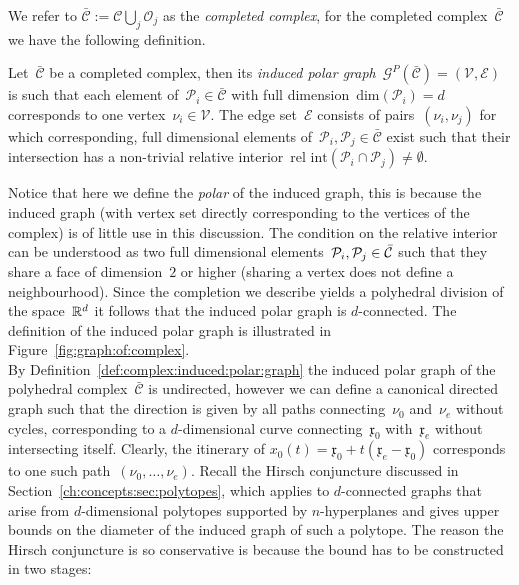 %
We refer to $\bar{\mathcal C}:=\mathcal C\bigcup_j\mathcal O_j$ as the \emph{completed complex}, for the completed complex~$\bar{\mathcal C}$ we have the following definition.
%
\begin{defi}\label{def:complex:induced:polar:graph}
Let~$\bar{\mathcal C}$ be a completed complex, then its \emph{induced polar graph}~$\mathcal G^P(\bar{\mathcal C})=(\mathcal V,\mathcal E)$ is such that each element of~$\mathcal P_i\in\bar{\mathcal C}$ with full dimension~$\text{dim}(\mathcal P_i)=d$ corresponds to one vertex~$\nu_i\in\mathcal V$.
%
The edge set~$\mathcal E$ consists of pairs~$(\nu_i,\nu_j)$ for which corresponding, full dimensional elements of~$\mathcal P_i,\mathcal P_j\in\bar{\mathcal C}$ exist such that their intersection has a non-trivial relative interior~$\text{rel int}(\mathcal P_i\cap\mathcal P_j)\neq\emptyset$.
\end{defi}
%
\noindent Notice that here we define the \emph{polar} of the induced graph, this is because the induced graph (with vertex set directly corresponding to the vertices of the complex) is of little use in this discussion.
%
The condition on the relative interior can be understood as two full dimensional elements~$\mathcal P_i,\mathcal P_j\in\bar{\mathcal C}$ such that they share a face of dimension~$2$ or higher (sharing a vertex does not define a neighbourhood).
%
Since the completion we describe yields a polyhedral division of the space~$\mathbb R^d$ it follows that the induced polar graph is $d$-connected.
%
The definition of the induced polar graph is illustrated in Figure~\ref{fig:graph:of:complex}.
%
\\[1em]
%
\mysplit By Definition~\ref{def:complex:induced:polar:graph} the induced polar graph of the polyhedral complex~$\bar{\mathcal C}$ is undirected, however we can define a canonical directed graph such that the direction is given by all paths connecting~$\nu_0$ and~$\nu_e$ without cycles, corresponding to a $d$-dimensional curve connecting~$\mathfrak{x}_0$ with~$\mathfrak{x}_e$ without intersecting itself.
%
Clearly, the itinerary of $x_0(t) = \mathfrak{x}_0+t(\mathfrak{x}_e-\mathfrak{x}_0)$ corresponds to one such path~$(\nu_0,\dots,\nu_e)$.
%
Recall the Hirsch conjuncture discussed in Section~\ref{ch:concepts:sec:polytopes}, which applies to $d$-connected graphs that arise from $d$-dimensional polytopes supported by $n$-hyperplanes and gives upper bounds on the diameter of the induced graph of such a polytope.
%
The reason the Hirsch conjuncture is so conservative is because the bound has to be constructed in two stages:
